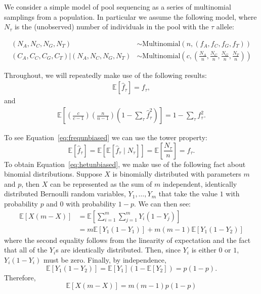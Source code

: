 \documentclass[letterpaper,fontsize=9pt,DIV=12]{scrartcl}
\newcommand{\samplesize}{n}
\newcommand{\coverage}{c}
\newcommand{\empfreq}{\widehat{f}}
\begin{document}
We consider a simple model of pool sequencing as a series of multinomial samplings from a population.  In particular we assume the following model, where $N_\tau$ is the (unobserved) number of individuals in the pool with the $\tau$ allele:

\begin{align*}
(N_A, N_C, N_G, N_T) &\sim \text{Multinomial}\left(\samplesize, (f_A, f_C, f_G, f_T)\right)\\
(C_A, C_C, C_G, C_T) | (N_A, N_C, N_G, N_T) &\sim \text{Multinomial}\left(\coverage, \left(\frac{N_A}{\samplesize}, \frac{N_C}{\samplesize},\frac{N_G}{\samplesize},\frac{N_T}{\samplesize}\right)\right)
\end{align*}

Throughout, we will repeatedly make use of the following results:
\begin{align}
\mathbb{E}\left[\empfreq_\tau\right] = f_\tau, \label{eq:frequnbiased}
\end{align}
and
\begin{align}
\mathbb{E}\left[\left(\frac{\coverage}{\coverage-1}\right)\left(\frac{\samplesize}{\samplesize-1}\right)\left(1-\sum_\tau\empfreq_\tau^2\right)\right] = 1-\sum_\tau f_\tau^2. \label{eq:hetunbiased}
\end{align}

To see Equation~\ref{eq:frequnbiased} we can use the tower property:
\[
\mathbb{E}\left[\empfreq_\tau\right] = \mathbb{E}\left[\mathbb{E}\left[\empfreq_\tau \mid N_\tau \right]\right] = \mathbb{E}\left[\frac{N_\tau}{n}\right] = f_\tau.
\]
To obtain Equation~\ref{eq:hetunbiased}, we make use of the following fact about binomial distributions.  Suppose $X$ is binomially distributed with parameters $m$ and $p$, then $X$ can be represented as the sum of $m$ independent, identically distributed Bernoulli random variables, $Y_1,\ldots,Y_m$ that take the value $1$ with probability $p$ and $0$ with probability $1-p$.  We can then see:
\begin{align*}
\mathbb{E}\left[X(m-X)\right] &= \mathbb{E}\left[\sum_{i=1}^m\sum_{j=1}^mY_i(1-Y_j)\right]\\
&= m\mathbb{E}\left[Y_1(1-Y_1)\right] + m(m-1)\mathbb{E}\left[Y_1(1-Y_2)\right]
\end{align*}
where the second equality follows from the linearity of expectation and the fact that all of the $Y_i$s are identically distributed.  Then, since $Y_i$ is either $0$ or $1$, $Y_i(1-Y_i)$ must be zero.  Finally, by independence,
\[
\mathbb{E}\left[Y_1(1-Y_2)\right] = \mathbb{E}\left[Y_1\right]\left(1-\mathbb{E}\left[Y_2\right]\right) = p(1-p).
\]
Therefore,
\[
\mathbb{E}\left[X(m-X)\right]  = m(m-1)p(1-p)
\]
\end{document}
